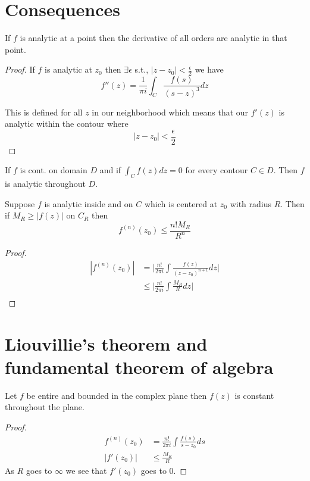 \section{Consequences}

\begin{theorem}
   If $f$ is analytic at a point then the derivative of all orders are analytic in that point.
\end{theorem}
\begin{proof}
   If $f$ is analytic at $z_0$ then $\exists \epsilon $ s.t.,  $ |z - z_0| < \frac{\epsilon}{2} $ we have 
   $$ f''(z) = \frac{1}{\pi i}\int_C \frac{f(s)}{(s - z)^{3}}dz$$ 

   This is defined for all $z$ in our neighborhood which means that our $f'(z)$ is analytic within the contour where 
   $$ |z - z_0| < \frac{\epsilon}{2} $$ 
\end{proof}

\begin{theorem}
   If $f$ is cont. on domain $D$ and if $\int_C f(z)dz = 0$ for every contour $C \in D$. Then $f$ is analytic throughout $D$.
\end{theorem}


\begin{theorem}
   Suppose $f$ is analytic inside and on $C$ which is centered at $z_0$ with radius $R$. Then if $M_R \ge |f(z)|$ on $C_R$ then $$f^{(n)}(z_0) \le \frac{n! M_R}{R^{n}}$$
\end{theorem}

\begin{proof}
   \begin{align*}
      |f^{(n)} (z_0) | &= \bigg | \frac{n!}{2\pi i} \int \frac{f(z)}{(z - z_0)^{n+1}} dz \bigg |\\
 &\le \bigg | \frac{n!}{2\pi i} \int \frac{M_R}{R} dz \bigg |\\
   \end{align*}
\end{proof}

\section{Liouvillie's theorem and fundamental theorem of algebra}

\begin{theorem}
   Let $f$ be entire and bounded in the complex plane then $f(z)$ is constant throughout the plane.
\end{theorem}
\begin{proof}
   \begin{align*}
      f^{(n)}(z_0) &= \frac{n!}{2\pi i} \int \frac{f(s)}{s - z_0} ds\\
      |f'(z_0)| &\le \frac{M_R}{R}
   \end{align*}
   As $R$ goes to $\infty$ we see that $f'(z_0)$ goes to $0$.
\end{proof}

